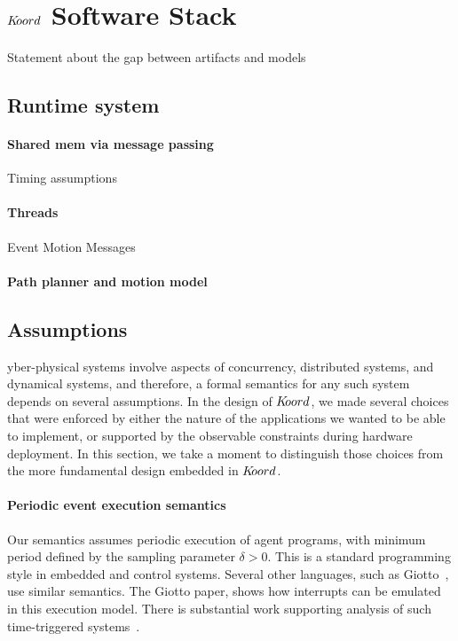 \section{$K\kern-2pt oord$ Software Stack}
\label{sec:verif}

Statement about the gap between artifacts and models 

\subsection{Runtime system}

\paragraph{Shared mem via message passing}
Timing assumptions

\paragraph{Threads}
Event
Motion
Messages

\paragraph{Path planner and motion model}



\subsection{Assumptions}
yber-physical systems involve aspects of concurrency, distributed systems, and dynamical systems, and therefore, a formal semantics for any such system depends on several assumptions. In the design of $K\kern-2pt oord$, we made several choices that were enforced by either the nature of the applications we wanted to be able to implement, or supported by the observable constraints during hardware deployment.  In this section, we take a moment to distinguish those choices from the more fundamental design embedded in $K\kern-2pt oord$.

\paragraph*{Periodic event execution semantics}
Our semantics assumes periodic execution of agent programs, with minimum period defined by the sampling parameter $\delta>0$. This is a standard programming style in embedded and control systems. Several other languages, such as Giotto~\cite{henzinger2003giotto,benveniste2003synchronous}, use  similar semantics. The Giotto paper, shows how  interrupts can be emulated in this execution model. There is substantial work supporting analysis of such time-triggered systems~\cite{WMLM:TECS2010}.

